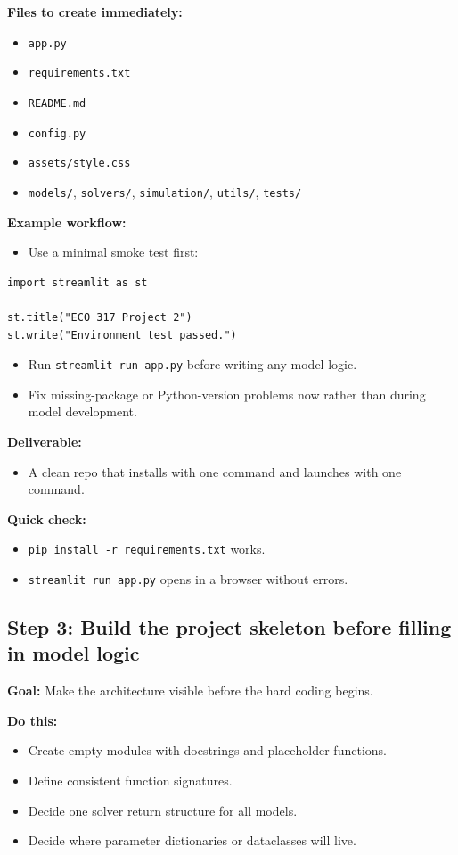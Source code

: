 \documentclass[11pt]{article}
\begin{document}
\textbf{Files to create immediately:}
\begin{itemize}
    \item \verb|app.py|
    \item \verb|requirements.txt|
    \item \verb|README.md|
    \item \verb|config.py|
    \item \verb|assets/style.css|
    \item \verb|models/|, \verb|solvers/|, \verb|simulation/|, \verb|utils/|, \verb|tests/|
\end{itemize}

\textbf{Example workflow:}
\begin{itemize}
    \item Use a minimal smoke test first:
\end{itemize}
\begin{lstlisting}
import streamlit as st

st.title("ECO 317 Project 2")
st.write("Environment test passed.")
\end{lstlisting}
\begin{itemize}
    \item Run \verb|streamlit run app.py| before writing any model logic.
    \item Fix missing-package or Python-version problems now rather than during model development.
\end{itemize}

\textbf{Deliverable:}
\begin{itemize}
    \item A clean repo that installs with one command and launches with one command.
\end{itemize}

\textbf{Quick check:}
\begin{itemize}
    \item \verb|pip install -r requirements.txt| works.
    \item \verb|streamlit run app.py| opens in a browser without errors.
\end{itemize}

\subsection{Step 3: Build the project skeleton before filling in model logic}
\textbf{Goal:} Make the architecture visible before the hard coding begins.

\textbf{Do this:}
\begin{itemize}
    \item Create empty modules with docstrings and placeholder functions.
    \item Define consistent function signatures.
    \item Decide one solver return structure for all models.
    \item Decide where parameter dictionaries or dataclasses will live.
\end{itemize}
\end{document}
